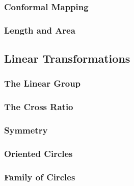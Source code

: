 \subsubsection{Conformal Mapping}
\subsubsection{Length and Area}
\subsection{Linear Transformations}
\subsubsection{The Linear Group}
\subsubsection{The Cross Ratio}
\subsubsection{Symmetry}
\subsubsection{Oriented Circles}
\subsubsection{Family of Circles}





